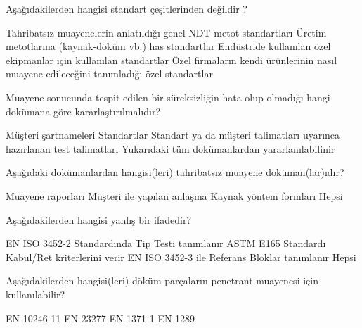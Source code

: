 \begin{question}[subtitle=]
  Aşağıdakilerden hangisi standart çeşitlerinden değildir ?
	\begin{tasks}
          \task Tahribatsız muayenelerin anlatıldığı genel NDT metot standartları
          \task Üretim metotlarına (kaynak-döküm vb.) has standartlar
          \task Endüstride kullanılan özel ekipmanlar için kullanılan standartlar 
          \task Özel firmaların kendi ürünlerinin nasıl muayene edileceğini tanımladığı özel standartlar \correct
	\end{tasks}
\end{question}
\begin{solution}
	\correct
\end{solution}

\begin{question}[subtitle=]
  Muayene sonucunda tespit edilen bir süreksizliğin hata olup olmadığı hangi dokümana göre kararlaştırılmalıdır?
	\begin{tasks}
          \task Müşteri şartnameleri 
          \task Standartlar
          \task Standart ya da müşteri talimatları uyarınca hazırlanan test talimatları
          \task Yukarıdaki tüm  dokümanlardan yararlanılabilinir \correct
	\end{tasks}
\end{question}
\begin{solution}
	\correct
\end{solution}


\begin{question}[subtitle=]
  Aşağıdaki dokümanlardan hangisi(leri) tahribatsız muayene doküman(lar)ıdır?
	\begin{tasks}
          \task Muayene raporları \correct 
          \task Müşteri ile yapılan anlaşma
          \task Kaynak yöntem formları  
          \task Hepsi
	\end{tasks}
\end{question}
\begin{solution}
	\correct
\end{solution}


\begin{question}[subtitle=]
  Aşağıdakilerden hangisi yanlış bir ifadedir?
	\begin{tasks}
          \task EN ISO 3452-2 Standardında Tip Testi tanımlanır 
          \task ASTM E165 Standardı Kabul/Ret kriterlerini verir \correct
          \task EN ISO 3452-3 ile Referans Bloklar tanımlanır
          \task Hepsi
	\end{tasks}
\end{question}
\begin{solution}
	\correct
\end{solution}


\begin{question}[subtitle=]
  Aşağıdakilerden hangisi(leri) döküm parçaların penetrant muayenesi için kullanılabilir?
	\begin{tasks}
          \task EN 10246-11
          \task EN 23277
          \task EN 1371-1 \correct
          \task EN 1289
	\end{tasks}
\end{question}
\begin{solution}
	\correct
\end{solution}
